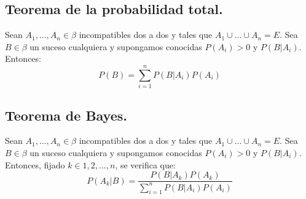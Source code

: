 \subsection{Teorema de la probabilidad total.}
Sean $A_{1},...,A_{n} \in \beta$ incompatibles dos a dos y tales que $A_{1} \cup ... \cup A_{n} = E$. Sea $B \in \beta$ un suceso cualquiera y supongamos conocidas $P(A_{i})>0$ y $P(B|A_{i})$. Entonces:
\[P(B) = \sum_{i=1}^{n} P(B|A_{i})P(A_{i})\]

\subsection{Teorema de Bayes.}
Sean $A_{1},...,A_{n} \in \beta$ incompatibles dos a dos y tales que $A_{1} \cup ... \cup A_{n} = E$. Sea $B \in \beta$ un suceso cualquiera y supongamos conocidas $P(A_{i})>0$ y $P(B|A_{i})$. Entonces, fijado $k \in {1,2,...,n}$, se verifica que:
\[P(A_{k}|B) = \frac{P(B|A_{k})P(A_{k})}{ \sum_{i=1}^{n} P(B|A_{i})P(A_{i})}\]